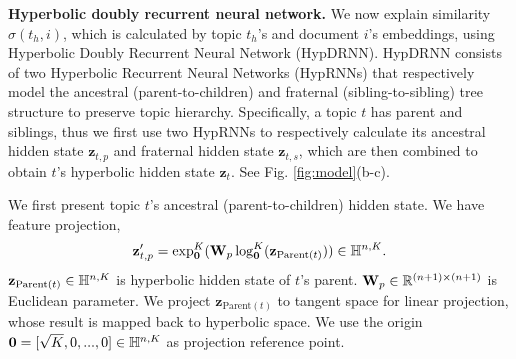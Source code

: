 \textbf{Hyperbolic doubly recurrent neural network.} We now explain similarity $ \sigma(t_h,i) $, which is calculated by topic $ t_h $'s and document $ i $'s embeddings, using Hyperbolic Doubly Recurrent Neural Network (HypDRNN). HypDRNN consists of two Hyperbolic Recurrent Neural Networks (HypRNNs) that respectively model the ancestral (parent-to-children) and fraternal (sibling-to-sibling) tree structure to preserve topic hierarchy. Specifically, a topic $ t $ has parent and siblings, thus we first use two HypRNNs to respectively calculate its ancestral hidden state $ \textbf{z}_{t,p} $ and fraternal hidden state $ \textbf{z}_{t,s} $, which are then combined to obtain $ t $'s hyperbolic hidden state $ \textbf{z}_t $. See Fig. \ref{fig:model}(b-c).

We first present topic $ t $'s ancestral (parent-to-children) hidden state. We have feature projection,
\begin{equation}
\label{eq:linear_transformation}
    \textbf{z}_{t,p}^\prime=\exp_{\textbf{0}}^K(\textbf{W}_p\log_{\textbf{0}}^K(\textbf{z}_{\text{Parent}(t)}))\in\Bbb H^{n,K}.
\end{equation}
$ \textbf{z}_{\text{Parent}(t)}\in\Bbb H^{n,K} $ is hyperbolic hidden state of $ t $'s parent. $ \textbf{W}_p\in\Bbb R^{(n+1)\times(n+1)} $ is Euclidean parameter. We project $ \textbf{z}_{\text{Parent}(t)} $ to tangent space for linear projection, whose result is mapped back to hyperbolic space. We use the origin $ \textbf{0}=[\sqrt{K},0,...,0]\in\Bbb H^{n,K} $ as projection reference point.

